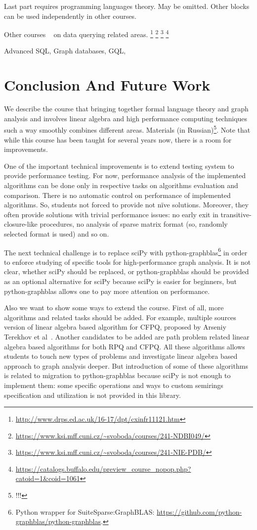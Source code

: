 \documentclass[sigconf]{acmart}
\begin{document}
Last part requires programming languages theory. May be omitted. Other blocks can be used independently in other courses.

Other courses ~\cite{Figueira2022} on data querying related areas.
\footnote{\url{http://www.drps.ed.ac.uk/16-17/dpt/cxinfr11121.htm}}
\footnote{\url{https://www.ksi.mff.cuni.cz/~svoboda/courses/241-NDBI049/}}
\footnote{\url{https://www.ksi.mff.cuni.cz/~svoboda/courses/241-NIE-PDB/}}
\footnote{\url{https://catalogs.buffalo.edu/preview_course_nopop.php?catoid=1&coid=1061}}

Advanced SQL, Graph databases, GQL, 

\section{Conclusion And Future Work}

We describe the course that bringing together formal language theory and graph analysis and involves linear algebra and high performance computing techniques such a way smoothly combines different areas. 
Materials (in Russian)\footnote{!!!}.
Note that while this course has been taught for several years now, there is a room for improvements.

One of the important technical improvements is to extend testing system to provide performance testing. 
For now, performance analysis of the implemented algorithms can be done only in respective tasks on algorithms evaluation and comparison.
There is no automatic control on performance of implemented algorithms. 
So, students not forced to provide not n\"ive solutions.
Moreover, they often provide solutions with trivial performance issues: no early exit in transitive-closure-like procedures, no analysis of sparse matrix format (so, randomly selected format is used) and so on.

The next technical challenge is to replace sciPy with python-graphblas\footnote{Python wrapper for SuiteSparse:GraphBLAS: \url{https://github.com/python-graphblas/python-graphblas}.} in order to enforce studying of specific tools for high-performance graph analysis. 
It is not clear, whether sciPy should be replaced, or python-graphblas should be provided as an optional alternative for sciPy because sciPy is easier for beginners, but python-graphblas allows one to pay more attention on performance.

Also we want to show some ways to extend the course. 
First of all, more algorithms and related tasks should be added.
For example, multiple sources version of linear algebra based algorithm for CFPQ, proposed by Arseniy Terekhov et al~\cite{terekhov2021multiple}.
Another candidates to be added are path problem related linear algebra based algorithms for both RPQ and CFPQ.
All these algorithms allows students to touch new types of problems and investigate linear algebra based approach to graph analysis deeper.
But introduction of some of these algorithms is related to migration to python-graphblas because sciPy is not enough to implement them: some specific operations and ways to custom semirings specification and utilization is not provided in this library.
\end{document}
